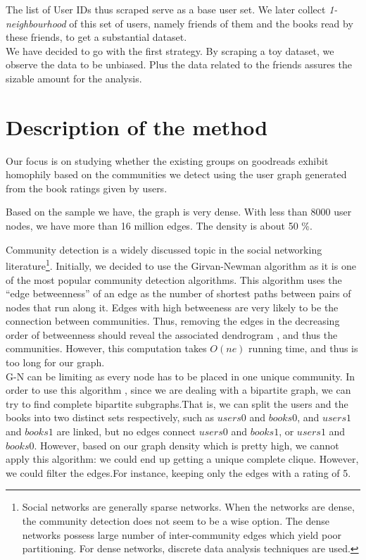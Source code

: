\documentclass[11pt]{article}
\begin{document}
The list of User IDs thus scraped serve as a base user set. We later collect {\it 1-neighbourhood} of this set of users, namely friends of them and the books read by these friends, to get a substantial dataset.\\
We have decided to go with the first strategy. By scraping a toy dataset, we observe the data to be unbiased. Plus the data related to the friends assures the sizable amount for the analysis.
\section{Description of the method}

Our focus is on studying whether the existing groups on goodreads exhibit homophily based on the communities we detect using the user graph generated from the book ratings given by users.

Based on the sample we have, the graph is very dense.
With less than 8000 user nodes, we have more than 16 million edges. The density is about 50 \%.

Community detection is a widely discussed topic in the social networking literature\footnote{Social networks are generally sparse networks. When the networks are dense, the community detection does not seem to be a wise option. The dense networks possess large number of inter-community edges which yield poor partitioning. For dense networks, discrete data analysis techniques are used.}\cite{clauset}.
Initially, we decided to use the Girvan-Newman algorithm as it is one of the most popular community detection algorithms\cite{newman}.
This algorithm uses the ``edge betweenness'' of an edge as the number of shortest paths between pairs of nodes that run along it.
Edges with high betweeness are very likely to be the connection between communities.
Thus, removing the edges in the decreasing order of betweenness should reveal the associated dendrogram , and thus the communities.
However, this computation takes $O(ne)$ running time, and thus is too long for our graph.\\

G-N can be limiting as every node has to be placed in one unique community.
In order to use this algorithm , since we are dealing with a bipartite graph, we can try to find complete bipartite subgraphs.That is, we can split the users and the books into two distinct sets respectively, such as $users0$ and $books0$, and $users1$ and $books1$ are linked, but no edges connect $users0$ and $books1$, or $users1$ and $books0$. However, based on our graph density which is pretty high, we cannot apply this algorithm: we could end up getting a unique complete clique.
However, we could filter the edges.For instance, keeping only the edges with a rating of 5.\\
\end{document}
